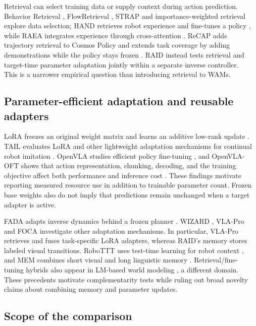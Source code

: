 \documentclass[11pt,a4paper]{article}
\begin{document}
Retrieval can select training data or supply context during action prediction. Behavior Retrieval \cite{ref19}, FlowRetrieval \cite{ref20}, STRAP \cite{ref21} and importance-weighted retrieval \cite{ref22} explore data selection; HAND retrieves robot experience and fine-tunes a policy \cite{ref23}, while RAEA integrates experience through cross-attention \cite{ref24}. ReCAP adds trajectory retrieval to Cosmos Policy and extends task coverage by adding demonstrations while the policy stays frozen \cite{ref40}. RAID instead tests retrieval and target-time parameter adaptation jointly within a separate inverse controller. This is a narrower empirical question than introducing retrieval to WAMs.

\subsection{Parameter-efficient adaptation and reusable adapters}

LoRA freezes an original weight matrix and learns an additive low-rank update \cite{ref6}. TAIL evaluates LoRA and other lightweight adaptation mechanisms for continual robot imitation \cite{ref4}. OpenVLA studies efficient policy fine-tuning \cite{ref25}, and OpenVLA-OFT shows that action representation, chunking, decoding, and the training objective affect both performance and inference cost \cite{ref26}. These findings motivate reporting measured resource use in addition to trainable parameter count. Frozen base weights also do not imply that predictions remain unchanged when a target adapter is active.

FADA adapts inverse dynamics behind a frozen planner \cite{ref5}. WIZARD \cite{ref27}, VLA-Pro \cite{ref28} and FOCA \cite{ref29} investigate other adaptation mechanisms. In particular, VLA-Pro retrieves and fuses task-specific LoRA adapters, whereas RAID's memory stores labeled visual transitions. RoboTTT uses test-time learning for robot context \cite{ref34}, and MEM combines short visual and long linguistic memory \cite{ref37}. Retrieval/fine-tuning hybrids also appear in LM-based world modeling \cite{ref41}, a different domain. These precedents motivate complementarity tests while ruling out broad novelty claims about combining memory and parameter updates.

\subsection{Scope of the comparison}
\end{document}

